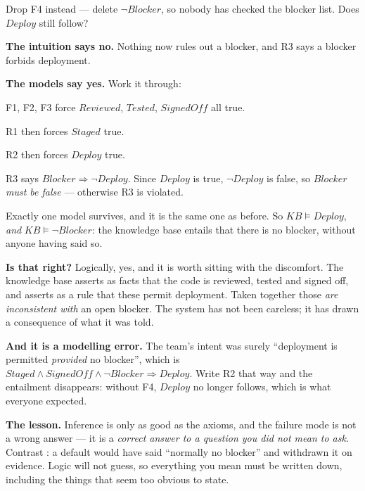 \begin{worked}
Drop F4 instead --- delete $\neg \mathit{Blocker}$, so nobody has checked the
blocker list. Does $\mathit{Deploy}$ still follow?

\smallskip
\textbf{The intuition says no.} Nothing now rules out a blocker, and R3 says a
blocker forbids deployment.

\smallskip
\textbf{The models say yes.} Work it through:
\begin{tight}
  \item F1, F2, F3 force $\mathit{Reviewed}$, $\mathit{Tested}$,
        $\mathit{SignedOff}$ all true.
  \item R1 then forces $\mathit{Staged}$ true.
  \item R2 then forces $\mathit{Deploy}$ true.
  \item R3 says $\mathit{Blocker} \Rightarrow \neg\mathit{Deploy}$. Since
        $\mathit{Deploy}$ is true, $\neg\mathit{Deploy}$ is false, so
        $\mathit{Blocker}$ \emph{must be false} --- otherwise R3 is violated.
\end{tight}
Exactly one model survives, and it is the same one as before. So
$\mathit{KB} \models \mathit{Deploy}$, \emph{and} $\mathit{KB} \models \neg
\mathit{Blocker}$: the knowledge base entails that there is no blocker, without
anyone having said so.

\smallskip
\textbf{Is that right?} Logically, yes, and it is worth sitting with the
discomfort. The knowledge base asserts as facts that the code is reviewed, tested
and signed off, and asserts as a rule that these permit deployment. Taken together
those \emph{are inconsistent with} an open blocker. The system has not been
careless; it has drawn a consequence of what it was told.

\smallskip
\textbf{And it is a modelling error.} The team's intent was surely ``deployment is
permitted \emph{provided} no blocker'', which is
$\mathit{Staged} \wedge \mathit{SignedOff} \wedge \neg \mathit{Blocker}
\Rightarrow \mathit{Deploy}$. Write R2 that way and the entailment disappears:
without F4, $\mathit{Deploy}$ no longer follows, which is what everyone expected.

\smallskip
\textbf{The lesson.} Inference is only as good as the axioms, and the failure mode
is not a wrong answer --- it is a \emph{correct answer to a question you did not
mean to ask}. Contrast : a default would have said ``normally no blocker''
and withdrawn it on evidence. Logic will not guess, so everything you mean must be
written down, including the things that seem too obvious to state.
\end{worked}

